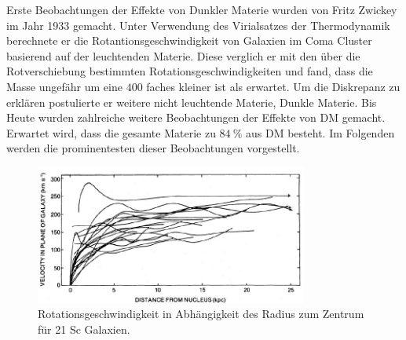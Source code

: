 Erste Beobachtungen der Effekte von Dunkler Materie wurden von Fritz Zwickey im Jahr 1933 gemacht.
Unter Verwendung des Virialsatzes der Thermodynamik berechnete er die Rotantionsgeschwindigkeit von Galaxien im Coma Cluster basierend auf der leuchtenden Materie.
Diese verglich er mit den über die Rotverschiebung bestimmten Rotationsgeschwindigkeiten und fand, dass die Masse ungefähr um eine $400$ faches kleiner ist als erwartet.\cite{Zwicky1933}
Um die Diskrepanz zu erklären postulierte er weitere nicht leuchtende Materie, Dunkle Materie.
Bis Heute wurden zahlreiche weitere Beobachtungen der Effekte von DM gemacht.
Erwartet wird, dass die gesamte Materie zu $\SI{84}{\percent}$\cite{Adam2016} aus DM besteht.
Im Folgenden werden die prominentesten dieser Beobachtungen vorgestellt.

\begin{figure}[!b]
\begin{center}
\includegraphics[width=0.8\textwidth]{./fig/Rubin80.pdf}
\end{center}
\caption{Rotationsgeschwindigkeit in Abhängigkeit des Radius zum Zentrum für 21 Sc Galaxien.\cite{Rubin80}}
\label{fig:Rubin21Sc}
\end{figure}

